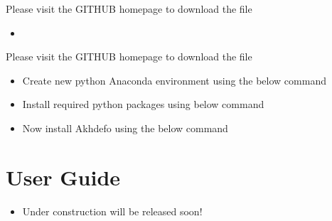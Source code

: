 \documentclass[letterpaper,10pt]{sphinxmanual}
\begin{document}
\sphinxAtStartPar
Please visit the GITHUB homepage to download the file
\begin{itemize}
\item {} 
\sphinxAtStartPar
{}

\end{itemize}

\sphinxAtStartPar
Please visit the GITHUB homepage to download the file
\begin{itemize}
\item {} 
\sphinxAtStartPar
Create new python Anaconda environment using the below command

\end{itemize}

\begin{sphinxVerbatim}[commandchars=\\\{\}]
    

\end{sphinxVerbatim}
\begin{itemize}
\item {} 
\sphinxAtStartPar
Install required python packages using below command

\end{itemize}

\begin{sphinxVerbatim}[commandchars=\\\{\}]
   
\end{sphinxVerbatim}
\begin{itemize}
\item {} 
\sphinxAtStartPar
Now install Akhdefo using the below command

\end{itemize}

\begin{sphinxVerbatim}[commandchars=\\\{\}]
  
\end{sphinxVerbatim}


\chapter{User Guide}
\label{\detokenize{README:user-guide}}\begin{itemize}
\item {} 
\sphinxAtStartPar
Under construction will be released soon!

\end{itemize}
\end{document}

